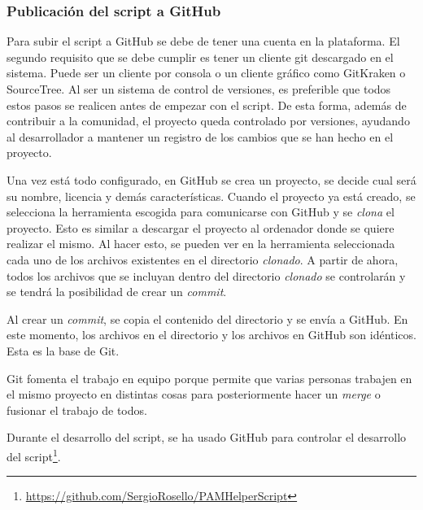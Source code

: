\documentclass[twoside, titlepage, 12pt, a4paper]{article}
\begin{document}
\subsubsection{Publicación del \gls{script} a \gls{GitHub}}
Para subir el \gls{script} a \gls{GitHub} se debe de tener una cuenta en la plataforma. El segundo requisito que se debe cumplir es tener un cliente git descargado en el sistema. Puede ser un cliente por consola o un cliente gráfico como GitKraken o SourceTree. Al ser un sistema de control de versiones, es preferible que todos estos pasos se realicen antes de empezar con el \gls{script}. De esta forma, además de contribuir a la comunidad, el proyecto queda controlado por versiones, ayudando al desarrollador a mantener un registro de los cambios que se han hecho en el proyecto.\par
Una vez está todo configurado, en \gls{GitHub} se crea un proyecto, se decide cual será su nombre, licencia y demás características. Cuando el proyecto ya está creado, se selecciona la herramienta escogida para comunicarse con \gls{GitHub} y se \textit{clona} el proyecto. Esto es similar a descargar el proyecto al ordenador donde se quiere realizar el mismo. Al hacer esto, se pueden ver en la herramienta seleccionada cada uno de los archivos existentes en el directorio \textit{clonado}. A partir de ahora, todos los archivos que se incluyan dentro del directorio \textit{clonado} se controlarán y se tendrá la posibilidad de crear un \textit{commit}.\par
Al crear un \textit{commit}, se copia el contenido del directorio y se envía a \gls{GitHub}. En este momento, los archivos en el directorio y los archivos en \gls{GitHub} son idénticos. Esta es la base de Git.\par
\gls{Git} fomenta el trabajo en equipo porque permite que varias personas trabajen en el mismo proyecto en distintas cosas para posteriormente hacer un \textit{merge} o fusionar el trabajo de todos.\par
Durante el desarrollo del \gls{script}, se ha usado \gls{GitHub} para controlar el desarrollo del \gls{script}\footnote{\url{https://github.com/SergioRosello/PAMHelperScript}}.
\end{document}
